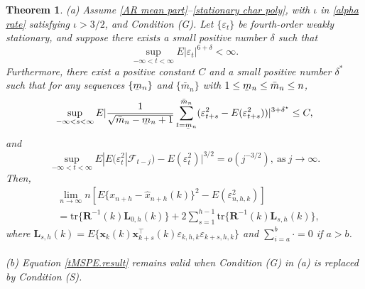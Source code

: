\documentclass[ejsv2]{imsart}
\newcommand{\ubar}[1]{\underaccent{\bar}{#1}}
\theoremstyle{plain}
\newtheorem{theorem}{Theorem}[section]
\theoremstyle{definition}
\theoremstyle{remark}
\newtheorem{remark}{Remark}[section]
\begin{document}
\begin{theorem}\label{tMSPE}
{\rm (a)} Assume \eqref{AR mean part}--\eqref{stationary char poly}, with $\iota$ in \eqref{alpha rate} satisfying $\iota>3/2$, and Condition (G). 
Let $\{\varepsilon_t\}$ be fourth-order weakly stationary, and suppose there exists a small positive number $\delta$ such that
\begin{equation}\label{tMSPE.moment}
\sup\limits_{-\infty<t<\infty}E|\varepsilon_t|^{6+\delta}<\infty.
\end{equation}
Furthermore, 
there exist 
a positive constant $C$
and a small positive number $\delta^{*}$
such that
for any sequences $\{\ubar{m}_{n}\}$ and $\{\bar{m}_{n}\}$ with $1\leq \ubar{m}_{n}\leq \bar{m}_{n}\leq n$,
\begin{equation}\label{tMSPE.moment2}
\sup\limits_{-\infty<s<\infty}E|\frac{1}{\sqrt{\bar{m}_{n}-\ubar{m}_{n}+1}}\sum_{t=\ubar{m}_{n}}^{\bar{m}_{n}}(\varepsilon_{t+s}^2-E(\varepsilon_{t+s}^2))|^{3+\delta^\star}\leq C,
\end{equation}
and
\begin{equation}\label{tMSPE.conditional moment}
\sup\limits_{-\infty<t<\infty} E|E(\varepsilon_t^2|\mathcal{F}_{t-j})-E(\varepsilon_t^2)|^{3/2}=o(j^{-3/2}),\ \textrm{as}\ j\to\infty.
\end{equation}
Then,
\begin{equation}\label{tMSPE.result}
\begin{split}
&\lim\limits_{n\to\infty}n[E\{x_{n+h}-\hat{x}_{n+h}(k)\}^2-E(\varepsilon_{n,h,k}^2)]\\
&= %
\mathrm{tr}\{\mathbf{R}^{-1}(k)\mathbf{L}_{0,h}(k)\}+2\sum_{s=1}^{h-1}\mathrm{tr}\{\mathbf{R}^{-1}(k)\mathbf{L}_{s,h}(k)\},
\end{split}
\end{equation}
where $\mathbf{L}_{s,h}(k)=E\{\mathbf{x}_k(k)\mathbf{x}_{k+s}^\top(k)\varepsilon_{k,h,k}\varepsilon_{k+s,h,k}\}$ and $\sum_{i=a}^{b}\cdot =0$ if $a>b$.
\\
\\
{\rm (b)} Equation \eqref{tMSPE.result} remains valid when
Condition (G) in (a) is replaced by Condition (S).
\end{theorem}

\end{document}
